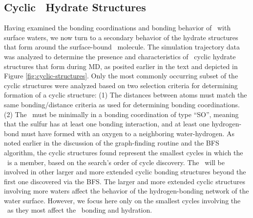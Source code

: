 \subsection{Cyclic \suldiox~Hydrate Structures}

Having examined the bonding coordinations and bonding behavior of \suldiox~with surface waters, we now turn to a secondary behavior of the hydrate structures that form around the surface-bound \suldiox~molecule. The simulation trajectory data was analyzed to determine the presence and characteristics of \suldiox~cyclic hydrate structures that form during MD, as posited earlier in the text and depicted in Figure \ref{fig:cyclic-structures}. Only the most commonly occurring subset of the cyclic structures were analyzed based on two selection criteria for determining formation of a cyclic structure: (1) The distances between atoms must match the same bonding/distance criteria as used for determining bonding coordinations. (2) The \suldiox~must be minimally in a bonding coordination of type ``SO'', meaning that the sulfur has at least one bonding interaction, and at least one hydrogen-bond must have formed with an oxygen to a neighboring water-hydrogen. As noted earlier in the discussion of the graph-finding routine and the BFS algorithm, the cyclic structures found represent the smallest cycles in which the \suldiox~is a member, based on the search's order of cycle discovery. The \suldiox~will be involved in other larger and more extended cyclic bonding structures beyond the first one discovered via the BFS. The larger and more extended cyclic structures involving more waters affect the behavior of the hydrogen-bonding network of the water surface. However, we focus here only on the smallest cycles involving the \suldiox~as they most affect the \suldiox~bonding and hydration.

